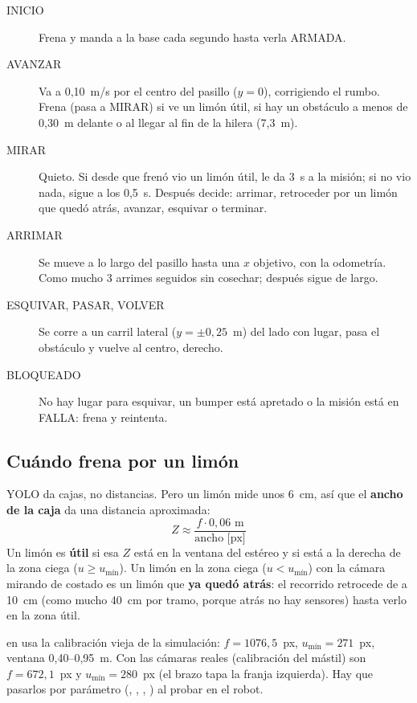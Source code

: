 \begin{description}
  \item[INICIO] Frena y manda  a la base cada segundo hasta verla ARMADA.
  \item[AVANZAR] Va a 0,10~m/s por el centro del pasillo ($y = 0$), corrigiendo el rumbo. Frena (pasa a MIRAR) si ve
        un limón útil, si hay un obstáculo a menos de 0,30~m delante o al llegar al fin de la hilera (7,3~m).
  \item[MIRAR] Quieto. Si desde que frenó vio un limón útil, le da 3~s a la misión; si no vio nada, sigue a los
        0,5~s. Después decide: arrimar, retroceder por un limón que quedó atrás, avanzar, esquivar o terminar.
  \item[ARRIMAR] Se mueve a lo largo del pasillo hasta una $x$ objetivo, con la odometría. Como mucho 3 arrimes
        seguidos sin cosechar; después sigue de largo.
  \item[ESQUIVAR, PASAR, VOLVER] Se corre a un carril lateral ($y = \pm 0{,}25$~m) del lado con lugar, pasa el
        obstáculo y vuelve al centro, derecho.
  \item[BLOQUEADO] No hay lugar para esquivar, un bumper está apretado o la misión está en FALLA: frena y reintenta.
\end{description}

\subsection{Cuándo frena por un limón}
YOLO da cajas, no distancias. Pero un limón mide unos 6~cm, así que el \textbf{ancho de la caja} da una distancia
aproximada:
\[
  Z \approx \frac{f \cdot 0{,}06\text{ m}}{\text{ancho [px]}}
\]
Un limón es \textbf{útil} si esa $Z$ está en la ventana del estéreo y si está a la derecha de la zona ciega
($u \geq u_\text{mín}$). Un limón en la zona ciega ($u < u_\text{mín}$) con la cámara mirando de costado es un limón
que \textbf{ya quedó atrás}: el recorrido retrocede de a 10~cm (como mucho 40~cm por tramo, porque atrás no hay
sensores) hasta verlo en la zona útil.

\begin{pendiente}
 en  usa la calibración vieja de la simulación: $f = 1076{,}5$~px,
$u_\text{mín} = 271$~px, ventana 0,40--0,95~m. Con las cámaras reales (calibración del mástil) son $f = 672{,}1$~px y
$u_\text{mín} = 280$~px (el brazo tapa la franja izquierda). Hay que pasarlos por parámetro (, , , ) al
probar en el robot.
\end{pendiente}

